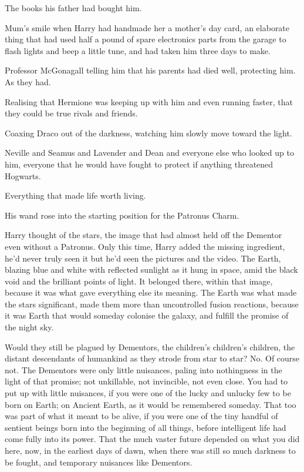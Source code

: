 The books his father had bought him.

Mum's smile when Harry had handmade her a mother's day card, an
elaborate thing that had used half a pound of spare electronics parts
from the garage to flash lights and beep a little tune, and had taken
him three days to make.

Professor McGonagall telling him that his parents had died well,
protecting him. As they had.

Realising that Hermione was keeping up with him and even running faster,
that they could be true rivals and friends.

Coaxing Draco out of the darkness, watching him slowly move toward the
light.

Neville and Seamus and Lavender and Dean and everyone else who looked up
to him, everyone that he would have fought to protect if anything
threatened Hogwarts.

Everything that made life worth living.

His wand rose into the starting position for the Patronus Charm.

Harry thought of the stars, the image that had almost held off the
Dementor even without a Patronus. Only this time, Harry added the
missing ingredient, he'd never truly seen it but he'd seen the pictures
and the video. The Earth, blazing blue and white with reflected sunlight
as it hung in space, amid the black void and the brilliant points of
light. It belonged there, within that image, because it was what gave
everything else its meaning. The Earth was what made the stars
significant, made them more than uncontrolled fusion reactions, because
it was Earth that would someday colonise the galaxy, and fulfill the
promise of the night sky.

Would they still be plagued by Dementors, the children's children's
children, the distant descendants of humankind as they strode from star
to star? No. Of course not. The Dementors were only little nuisances,
paling into nothingness in the light of that promise; not unkillable,
not invincible, not even close. You had to put up with little nuisances,
if you were one of the lucky and unlucky few to be born on Earth; on
Ancient Earth, as it would be remembered someday. That too was part of
what it meant to be alive, if you were one of the tiny handful of
sentient beings born into the beginning of all things, before
intelligent life had come fully into its power. That the much vaster
future depended on what you did here, now, in the earliest days of dawn,
when there was still so much darkness to be fought, and temporary
nuisances like Dementors.

